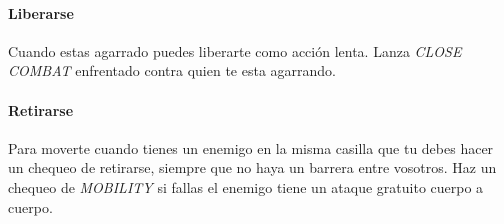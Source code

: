 \paragraph{Liberarse}
Cuando estas agarrado puedes liberarte como acción lenta. Lanza \emph{CLOSE COMBAT} enfrentado contra quien te esta agarrando.

\paragraph{Retirarse} \label{page:retreat}
Para moverte cuando tienes un enemigo en la misma casilla que tu debes hacer un chequeo de retirarse, siempre que no haya un barrera entre vosotros. Haz un chequeo de \emph{MOBILITY} si fallas el enemigo tiene un ataque gratuito cuerpo a cuerpo.